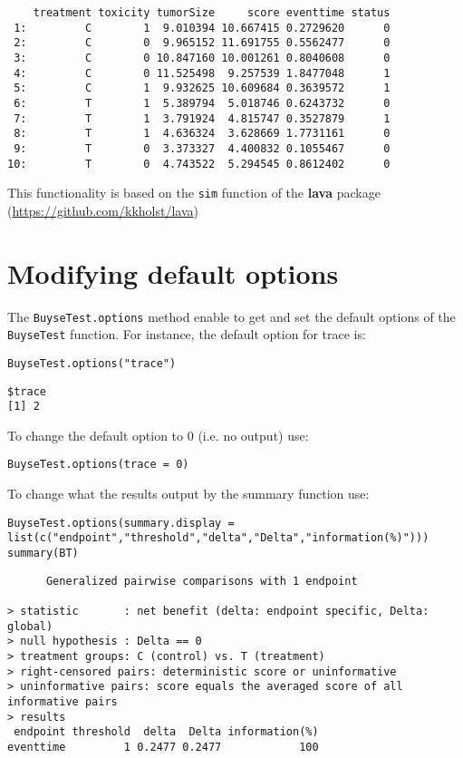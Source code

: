 \documentclass[12pt]{article}
\begin{document}
\begin{verbatim}
    treatment toxicity tumorSize     score eventtime status
 1:         C        1  9.010394 10.667415 0.2729620      0
 2:         C        0  9.965152 11.691755 0.5562477      0
 3:         C        0 10.847160 10.001261 0.8040608      0
 4:         C        0 11.525498  9.257539 1.8477048      1
 5:         C        1  9.932625 10.609684 0.3639572      1
 6:         T        1  5.389794  5.018746 0.6243732      0
 7:         T        1  3.791924  4.815747 0.3527879      1
 8:         T        1  4.636324  3.628669 1.7731161      0
 9:         T        0  3.373327  4.400832 0.1055467      0
10:         T        0  4.743522  5.294545 0.8612402      0
\end{verbatim}

This functionality is based on the \texttt{sim} function of the \textbf{lava}
package (\url{https://github.com/kkholst/lava})

\clearpage

\section{Modifying default options}
\label{sec:orgf38f589}
The \texttt{BuyseTest.options} method enable to get and set the default
options of the \texttt{BuyseTest} function. For instance, the default option
for trace is:
\lstset{language=r,label= ,caption= ,captionpos=b,numbers=none}
\begin{lstlisting}
BuyseTest.options("trace")
\end{lstlisting}

\begin{verbatim}
$trace
[1] 2
\end{verbatim}

To change the default option to 0 (i.e. no output) use:
\lstset{language=r,label= ,caption= ,captionpos=b,numbers=none}
\begin{lstlisting}
BuyseTest.options(trace = 0)
\end{lstlisting}

To change what the results output by the summary function use:
\lstset{language=r,label= ,caption= ,captionpos=b,numbers=none}
\begin{lstlisting}
BuyseTest.options(summary.display = list(c("endpoint","threshold","delta","Delta","information(%)")))
summary(BT)
\end{lstlisting}

\begin{verbatim}
      Generalized pairwise comparisons with 1 endpoint

> statistic       : net benefit (delta: endpoint specific, Delta: global) 
> null hypothesis : Delta == 0 
> treatment groups: C (control) vs. T (treatment) 
> right-censored pairs: deterministic score or uninformative
> uninformative pairs: score equals the averaged score of all informative pairs
> results
 endpoint threshold  delta  Delta information(%)
eventtime         1 0.2477 0.2477            100
\end{verbatim}
\end{document}
